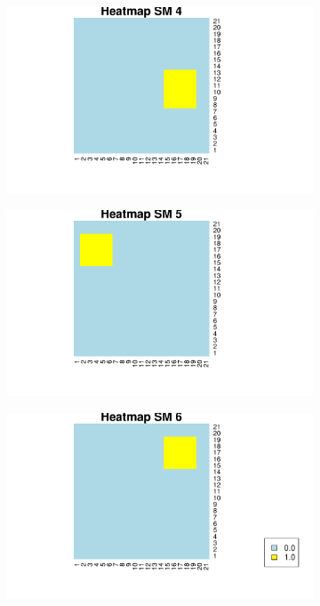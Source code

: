 \documentclass[11pt]{article}
\begin{document}
\begin{figure}[t]
\begin{subfigure}{.35\textwidth}
  \includegraphics[width=.95\linewidth]{plots/SM4plot.pdf}
  \label{fig:sub1}
\end{subfigure}%
 \begin{subfigure}{.35\textwidth}
  \includegraphics[width=.95\linewidth]{plots/SM5plot.pdf}
  \label{fig:sub1}
\end{subfigure}%
 \begin{subfigure}{.35\textwidth}
  \includegraphics[width=.95\linewidth]{plots/SM6plot_legend.pdf}
  \label{fig:sub1}
\end{subfigure}%
\end{figure}
\end{document}
